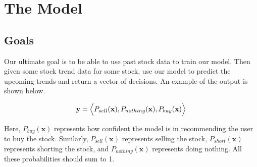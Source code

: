 \documentclass[final]{article}
\begin{document}


\section{The Model}

\subsection{Goals}

Our ultimate goal is to be able to use past stock data to train our
model. Then given some stock trend data for some stock, use our model
to predict the upcoming trends and return a vector of decisions. An
example of the output is shown below.

\[
  \mathbf{y} = \Bigl<P_{sell}(\mathbf{x}), P_{nothing}(\mathbf{x}),
  P_{buy}(\mathbf{x})\Bigr>
\]

Here, $P_{buy}(\mathbf{x})$ represents how confident the model is in
recommending the user to buy the stock. Similarly,
$P_{sell}(\mathbf{x})$ represents selling the stock,
$P_{short}(\mathbf{x})$ represents shorting the stock, and
$P_{nothing}(\mathbf{x})$ represents doing nothing. All these
probabilities should sum to 1.
\end{document}
